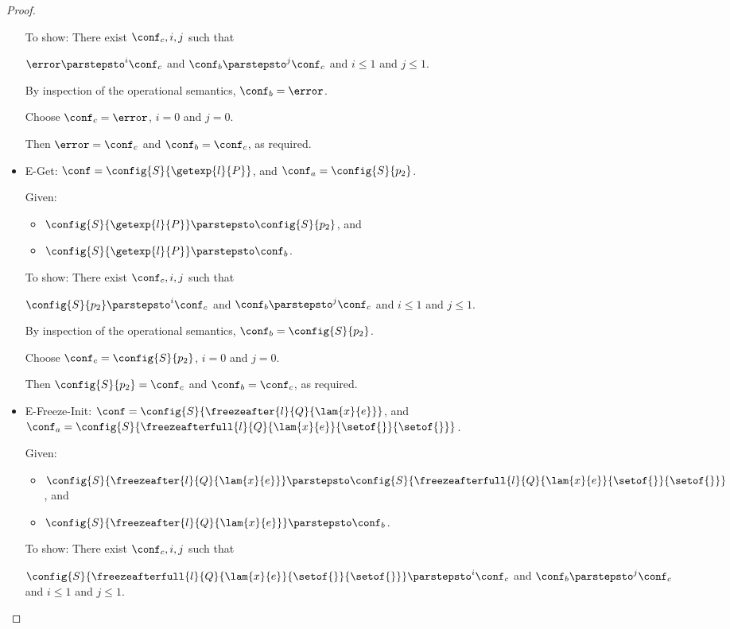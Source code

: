 \begin{proof}
\begin{itemize}
      To show: There exist $\conf_c, i, j$ such that

      $\error \parstepsto^i \conf_c$ and $\conf_b \parstepsto^j
      \conf_c$ and $i \leq 1$ and $j \leq 1$.

      By inspection of the operational semantics, $\conf_b = \error$.

      Choose $\conf_c = \error$, $i = 0$ and $j = 0$.

      Then $\error = \conf_c$ and $\conf_b = \conf_c$, as required.

    \item {\sc E-Get}: $\conf = \config{S}{\getexp{l}{P}}$, and
      $\conf_a = \config{S}{p_2}$.

      Given:
      \begin{itemize}
      \item $\config{S}{\getexp{l}{P}} \parstepsto \config{S}{p_2}$, and
      \item $\config{S}{\getexp{l}{P}} \parstepsto \conf_b$.
      \end{itemize}

      To show: There exist $\conf_c, i, j$ such that

      $\config{S}{p_2} \parstepsto^i \conf_c$ and $\conf_b
      \parstepsto^j \conf_c$ and $i \leq 1$ and $j \leq 1$.

      By inspection of the operational semantics, $\conf_b =
      \config{S}{p_2}$.

      Choose $\conf_c = \config{S}{p_2}$, $i = 0$ and $j = 0$.

      Then $\config{S}{p_2} = \conf_c$ and $\conf_b = \conf_c$, as
      required.

    \item {\sc E-Freeze-Init}: $\conf =
      \config{S}{\freezeafter{l}{Q}{\lam{x}{e}}}$, and $\conf_a =
      \config{S}{\freezeafterfull{l}{Q}{\lam{x}{e}}{\setof{}}{\setof{}}}$.

      Given:
      \begin{itemize}
      \item $\config{S}{\freezeafter{l}{Q}{\lam{x}{e}}} \parstepsto
        \config{S}{\freezeafterfull{l}{Q}{\lam{x}{e}}{\setof{}}{\setof{}}}$,
        and
      \item $\config{S}{\freezeafter{l}{Q}{\lam{x}{e}}} \parstepsto
        \conf_b$.
      \end{itemize}

      To show: There exist $\conf_c, i, j$ such that

      $\config{S}{\freezeafterfull{l}{Q}{\lam{x}{e}}{\setof{}}{\setof{}}}
      \parstepsto^i \conf_c$ and $\conf_b \parstepsto^j \conf_c$ and
      $i \leq 1$ and $j \leq 1$.


\end{itemize}
\end{proof}
